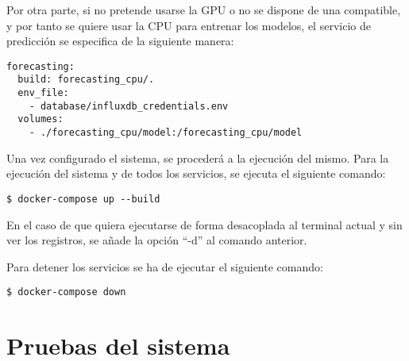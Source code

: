 Por otra parte, si no pretende usarse la GPU o no se dispone de una compatible, y por tanto se quiere usar la 
CPU para entrenar los modelos, el servicio de predicción se especifica de la siguiente manera:
\begin{lstlisting}
forecasting:
  build: forecasting_cpu/.
  env_file:
    - database/influxdb_credentials.env
  volumes:
    - ./forecasting_cpu/model:/forecasting_cpu/model
\end{lstlisting}

Una vez configurado el sistema, se procederá a la ejecución del mismo. Para la ejecución del sistema y de 
todos los servicios, se ejecuta el siguiente comando:
\begin{lstlisting}
$ docker-compose up --build
\end{lstlisting}
En el caso de que quiera ejecutarse de forma desacoplada al terminal actual y sin ver los registros, se añade 
la opción ``-d'' al comando anterior.

Para detener los servicios se ha de ejecutar el siguiente comando:
\begin{lstlisting}
$ docker-compose down
\end{lstlisting}

\section{Pruebas del sistema}

